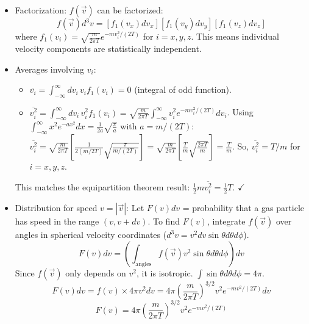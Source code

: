 \documentclass[11pt]{article}
\newcommand{\avg}[1]{\overline{#1}}
\begin{document}
\begin{itemize}
    \item Factorization: $f(\vec{v})$ can be factorized:
    \[ f(\vec{v}) d^3v = [f_1(v_x) dv_x] [f_1(v_y) dv_y] [f_1(v_z) dv_z] \]
    where $f_1(v_i) = \sqrt{\frac{m}{2\pi T}} e^{-m v_i^2 / (2T)}$ for $i=x, y, z$.
    This means individual velocity components are statistically independent.

    \begin{center}
    \end{center}

    \item Averages involving $v_i$:
        \begin{itemize}
            \item $\avg{v_i} = \int_{-\infty}^{\infty} dv_i \, v_i f_1(v_i) = 0$ (integral of odd function).
            \item $\avg{v_i^2} = \int_{-\infty}^{\infty} dv_i \, v_i^2 f_1(v_i) = \sqrt{\frac{m}{2\pi T}} \int_{-\infty}^{\infty} v_i^2 e^{-m v_i^2 / (2T)} dv_i$.
            Using $\int_{-\infty}^{\infty} x^2 e^{-ax^2} dx = \frac{1}{2a}\sqrt{\frac{\pi}{a}}$ with $a=m/(2T)$:
            $\avg{v_i^2} = \sqrt{\frac{m}{2\pi T}} \left[ \frac{1}{2(m/2T)} \sqrt{\frac{\pi}{m/(2T)}} \right] = \sqrt{\frac{m}{2\pi T}} \left[ \frac{T}{m} \sqrt{\frac{2\pi T}{m}} \right] = \frac{T}{m}$.
            So, $\avg{v_i^2} = T/m$ for $i=x, y, z$.
        \end{itemize}
        This matches the equipartition theorem result: $\frac{1}{2} m \avg{v_i^2} = \frac{1}{2} T$. $\checkmark$

    \item Distribution for speed $v = |\vec{v}|$:
    Let $F(v) dv$ = probability that a gas particle has speed in the range $(v, v+dv)$.
    To find $F(v)$, integrate $f(\vec{v})$ over angles in spherical velocity coordinates ($d^3v = v^2 dv \sin\theta d\theta d\phi$).
    \[ F(v) dv = \left( \int_{\text{angles}} f(\vec{v}) v^2 \sin\theta d\theta d\phi \right) dv \]
    Since $f(\vec{v})$ only depends on $v^2$, it is isotropic. $\int \sin\theta d\theta d\phi = 4\pi$.
    \[ F(v) dv = f(v) \times 4\pi v^2 dv = 4\pi \left(\frac{m}{2\pi T}\right)^{3/2} v^2 e^{-m v^2 / (2T)} dv \]
    \[ F(v) = 4\pi \left(\frac{m}{2\pi T}\right)^{3/2} v^2 e^{-m v^2 / (2T)} \]


\end{itemize}
\end{document}
